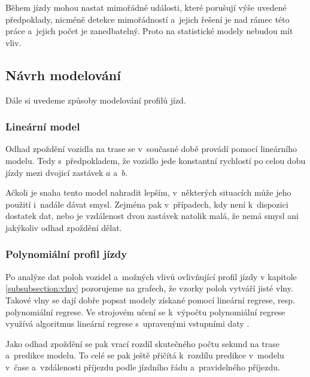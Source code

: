 \bigbreak

Během jízdy mohou nastat mimořádné události, které porušují výše uvedené předpoklady, nicméně detekce mimořádností a~jejich řešení je nad rámec této práce a~jejich počet je zanedbatelný. Proto na statistické modely nebudou mít vliv.


\subsection{Návrh modelování} \label{subsubsection:analyza_dat}



Dále si uvedeme způsoby modelování profilů jízd.


\subsubsection{Lineární model}

Odhad zpoždění vozidla na trase se v~současné době provádí pomocí lineárního modelu. Tedy s~předpokladem, že vozidlo jede konstantní rychlostí po celou dobu jízdy mezi dvojicí zastávek $a$ a~$b$.


\bigbreak

Ačkoli je snaha tento model nahradit lepším, v~některých situacích může jeho použití i~nadále dávat smysl. Zejména pak v~případech, kdy není k~dispozici dostatek dat, nebo je vzdálenost dvou zastávek natolik malá, že nemá smysl ani jakýkoliv odhad zpoždění dělat.


\subsubsection{Polynomiální profil jízdy}

Po analýze dat poloh vozidel a~možných vlivů ovlivňující profil jízdy v kapitole \ref{subsubsection:vlny} pozorujeme na grafech, že vzorky poloh vytváří jisté vlny. Takové vlny se dají dobře popsat modely získané pomocí lineární regrese, resp. polynomiální regrese. Ve strojovém učení se k~výpočtu polynomiální regrese využívá algoritmus lineární regrese s~upravenými vstupními daty \citep[viz][Strany 265--268]{Gareth13}.


\bigbreak

Jako odhad zpoždění se pak vrací rozdíl skutečného počtu sekund na trase a~predikce modelu. To celé se pak ještě přičítá k~rozdílu predikce v~modelu v~čase a~vzdálenosti příjezdu podle jízdního řádu a~pravidelného příjezdu.


\bigbreak

